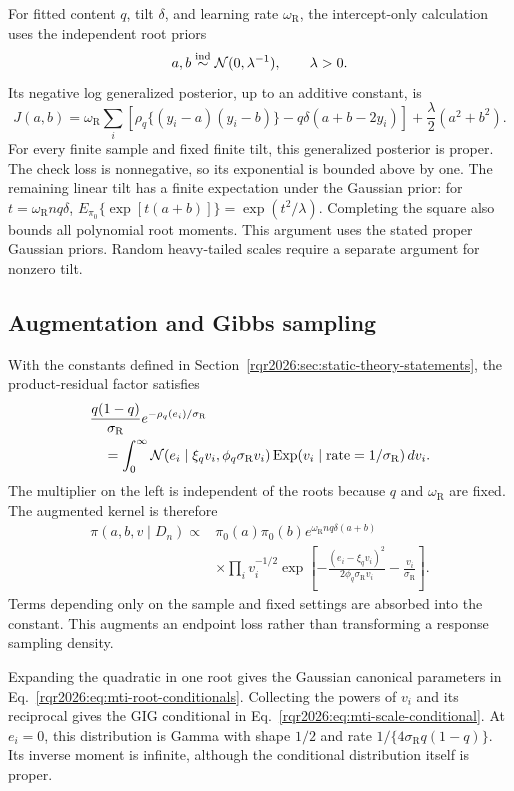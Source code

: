 For fitted content \(q\), tilt \(\delta\), and learning rate
\(\omega_{\mathrm R}\), the intercept-only calculation uses the independent
root priors
\[
a,b\stackrel{\mathrm{ind}}{\sim}\mathcal{N}(0,\lambda^{-1}),
\qquad \lambda>0.
\]
Its negative log generalized posterior, up to an additive constant, is
\[
J(a,b)=\omega_{\mathrm R}\sum_i
[\rho_q\{(y_i-a)(y_i-b)\}-q\delta(a+b-2y_i)]
+\frac\lambda2(a^2+b^2).
\]
For every finite sample and fixed finite tilt, this generalized posterior is
proper. The check loss is nonnegative, so its exponential is bounded above
by one. The remaining linear tilt has a finite expectation under the
Gaussian prior: for \(t=\omega_{\mathrm R}nq\delta\),
\(E_{\pi_0}\{\exp[t(a+b)]\}=\exp(t^2/\lambda)\). Completing the square
also bounds all polynomial root moments. This argument uses the stated
proper Gaussian priors. Random heavy-tailed scales require a separate
argument for nonzero tilt.

\subsection{Augmentation and Gibbs sampling}

With the constants defined in Section~\ref{rqr2026:sec:static-theory-statements},
the product-residual factor satisfies
\begin{align*}
&\frac{q(1-q)}{\sigma_{\mathrm R}}
  e^{-\rho_q(e_i)/\sigma_{\mathrm R}}\\
&\quad=\int_0^\infty
\mathcal{N}(e_i\mid\xi_qv_i,\phi_q\sigma_{\mathrm R}v_i)
\operatorname{Exp}(v_i\mid\mathrm{rate}=1/\sigma_{\mathrm R})\,dv_i.
\end{align*}
The multiplier on the left is independent of the roots because
\(q\) and \(\omega_{\mathrm R}\) are fixed. The augmented kernel is therefore
\begin{align*}
\pi(a,b,v\mid D_n)\propto{}&
\pi_0(a)\pi_0(b)e^{\omega_{\mathrm R}nq\delta(a+b)}\\
&\times\prod_i v_i^{-1/2}
\exp\!\left[-\frac{(e_i-\xi_qv_i)^2}
{2\phi_q\sigma_{\mathrm R}v_i}-\frac{v_i}{\sigma_{\mathrm R}}\right].
\end{align*}
Terms depending only on the sample and fixed settings are absorbed into the
constant. This augments an endpoint loss rather than transforming a response
sampling density.

Expanding the quadratic in one root gives the Gaussian canonical parameters
in Eq.~\eqref{rqr2026:eq:mti-root-conditionals}. Collecting the powers of
\(v_i\) and its reciprocal gives the GIG conditional in
Eq.~\eqref{rqr2026:eq:mti-scale-conditional}. At \(e_i=0\), this distribution
is Gamma with shape \(1/2\) and rate
\(1/\{4\sigma_{\mathrm R}q(1-q)\}\). Its inverse moment is infinite,
although the conditional distribution itself is proper.

